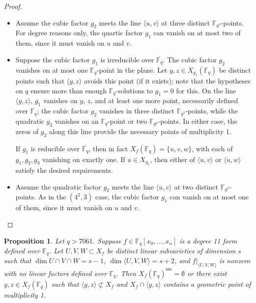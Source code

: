 \documentclass{amsart}
\newcommand{\F}{\mathbb{F}}
\newcommand{\Span}[1]{\langle #1 \rangle}
\newcommand{\sm}{\mathrm{sm}}
\newtheorem{proposition}[theorem]{Proposition}
\theoremstyle{definition}
\numberwithin{equation}{section}
\numberwithin{table}{section}
\newcommand{\qbound}[1]{{\color{cyan}$q > {#1}$}}
\renewcommand{\qbound}[1]{{$q > {#1}$}}
\begin{document}
\begin{proof}
\begin{itemize}
        \item[$(4^2,3)$] Assume the cubic factor $g_2$ meets the line $\Span{u,v}$ at three distinct $\F_{q^3}$-points. For degree reasons only, the quartic factor $g_1$ can vanish on at most two of them, since it must vanish on $u$ and $v$.
        
        \item[$(3^2,3,2)$] Suppose the cubic factor $g_1$ is irreducible over $\overline{\F_q}$. The cubic factor $g_2$ vanishes on at most one $\F_q$-point in the plane. Let $y,z \in X_{g_1}(\F_q)$ be distinct points such that $\Span{y,z}$ avoids this point (if it exists); note that the hypotheses on $q$ ensure more than enough $\F_q$-solutions to $g_1=0$ for this. On the line $\Span{y,z}$, $g_1$ vanishes on $y$, $z$, and at least one more point, necessarily defined over $\F_q$; the cubic factor $g_2$ vanishes in three distinct $\F_{q^3}$-points, while the quadratic $g_3$ vanishes on an $\F_q$-point or two $\F_{q^2}$-points. In either case, the zeros of $g_2$ along this line provide the necessary points of multiplicity 1. 

        If $g_1$ is reducible over $\overline{\F_q}$, then in fact $X_f(\F_q) = \{u,v,w\}$, with each of $g_1, g_2, g_3$ vanishing on exactly one. If $u \in X_{g_1}$, then either of $\Span{u,v}$ or $\Span{u,w}$ satisfy the desired requirements.

        \item[$(3^3,2)$] Assume the quadratic factor $g_2$ meets the line $\Span{u,v}$ at two distinct $\F_{q^2}$-points. As in the $(4^2,3)$ case, the cubic factor $g_1$ can vanish on at most one of them, since it must vanish on $u$ and $v$.
\end{itemize}\vspace{-1ex}
\end{proof}

\begin{proposition}
\label{prop:codim3bert_d=11}
    Let \qbound{7061}. Suppose $f \in \F_q[x_0,\ldots,x_n]$ is a degree 11 form defined over $\F_q$. Let $U, V, W \subset X_f$ be distinct linear subvarieties of dimension $s$ such that $\dim U \cap V \cap W = s-1$, $\dim \Span{U,V,W} = s+2$, and $f|_{\Span{U,V,W}}$ is nonzero with no linear factors defined over $\F_q$. Then $X_f(\F_q)^\sm = \emptyset$ or there exist $y,z \in X_f(\F_q)$ such that $\Span{y,z} \not\subset X_f$ and $X_f \cap \Span{y,z}$ contains a geometric point of multiplicity 1.
\end{proposition}
\end{document}
